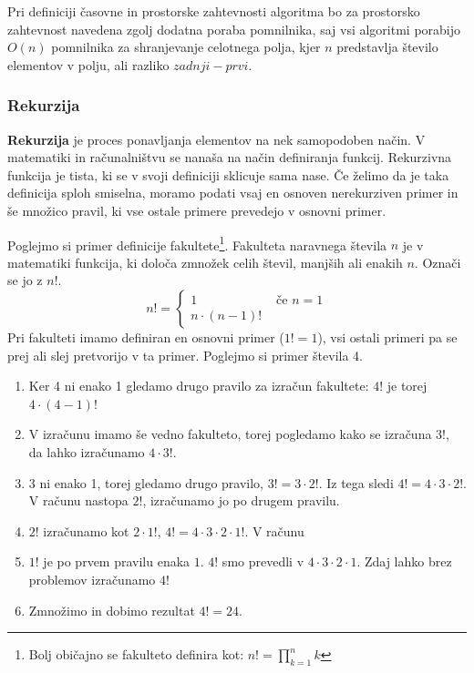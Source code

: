 \documentclass[a4paper,oneside]{article}
\begin{document}
Pri definiciji časovne in prostorske zahtevnosti algoritma bo za prostorsko zahtevnost 
navedena zgolj dodatna poraba pomnilnika, saj vsi algoritmi porabijo $O(n)$ pomnilnika za
shranjevanje celotnega polja, kjer $n$ predstavlja število elementov v polju, ali razliko
$zadnji - prvi$. 

\subsubsection{Rekurzija}
\textbf{Rekurzija} je proces ponavljanja elementov na nek samopodoben način.
V matematiki in računalništvu se nanaša na način definiranja funkcij.
Rekurzivna funkcija je tista, ki se v svoji definiciji sklicuje sama nase.
Če želimo da je taka definicija sploh smiselna, moramo podati vsaj en osnoven
nerekurziven primer in še množico pravil, ki vse ostale primere prevedejo v osnovni
primer.

Poglejmo si primer definicije fakultete\footnote{Bolj običajno se fakulteto definira kot:
$n! = \displaystyle\prod_{k=1}^{n} k$}. Fakulteta naravnega števila $n$ je v matematiki
funkcija, ki določa zmnožek celih števil, manjših ali enakih $n$. Označi se jo z $n!$.
\[
n! = \left\{ 
\begin{array}{rl}
     1 &\mbox{ če $n = 1$} \\
     n \cdot (n-1)!&
\end{array} \right.
\]
Pri fakulteti imamo definiran en osnovni primer ($1! = 1$), vsi ostali primeri pa se prej
ali slej pretvorijo v ta primer. Poglejmo si primer števila 4.
\begin{enumerate}
  \item Ker 4 ni enako 1 gledamo drugo pravilo za izračun fakultete: $4!$ je torej $4
    \cdot (4 - 1)!$
  \item V izračunu imamo še vedno fakulteto, torej pogledamo kako se izračuna $3!$, da
    lahko izračunamo $4 \cdot 3!$.
  \item 3 ni enako 1, torej gledamo drugo pravilo, $3! = 3 \cdot 2!$. Iz tega sledi $4! =
    4 \cdot 3 \cdot 2!$. V računu nastopa $2!$, izračunamo jo po drugem pravilu.
  \item $2!$ izračunamo kot $2 \cdot 1!$, $4! = 4 \cdot 3 \cdot 2 \cdot 1!$. V računu
  \item $1!$ je po prvem pravilu enaka $1$. $4!$ smo prevedli v $4 \cdot 3 \cdot 2 \cdot
    1$. Zdaj lahko brez problemov izračunamo $4!$
  \item Zmnožimo in dobimo rezultat $4! = 24$.
\end{enumerate}
\end{document}

